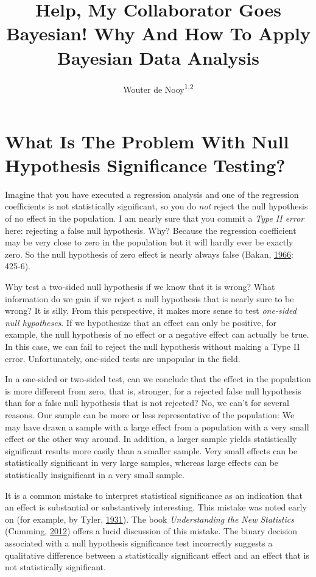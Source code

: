 \documentclass[doc]{apa6}
\title{Help, My Collaborator Goes Bayesian! Why And How To Apply Bayesian Data
Analysis}
\author{Wouter de Nooy\textsuperscript{1,2}}
\date{}
\affiliation{
\vspace{0.5cm}
\textsuperscript{1} Amsterdam School of Communication Research ASCor}
\begin{document}
\maketitle

\section{What Is The Problem With Null Hypothesis Significance
Testing?}\label{what-is-the-problem-with-null-hypothesis-significance-testing}

Imagine that you have executed a regression analysis and one of the
regression coefficients is not statistically significant, so you do
\emph{not} reject the null hypothesis of no effect in the population. I
am nearly sure that you commit a \emph{Type II error} here: rejecting a
false null hypothesis. Why? Because the regression coefficient may be
very close to zero in the population but it will hardly ever be exactly
zero. So the null hypothesis of zero effect is nearly always false
(Bakan,
\protect\hyperlink{ref-bakanTestSignificancePsychological1966}{1966}:
425-6).

Why test a two-sided null hypothesis if we know that it is wrong? What
information do we gain if we reject a null hypothesis that is nearly
sure to be wrong? It is silly. From this perspective, it makes more
sense to test \emph{one-sided null hypotheses}. If we hypothesize that
an effect can only be positive, for example, the null hypothesis of no
effect or a negative effect can actually be true. In this case, we can
fail to reject the null hypothesis without making a Type II error.
Unfortunately, one-sided tests are unpopular in the field.

In a one-sided or two-sided test, can we conclude that the effect in the
population is more different from zero, that is, stronger, for a
rejected false null hypothesis than for a false null hypothesis that is
not rejected? No, we can't for several reasons. Our sample can be more
or less representative of the population: We may have drawn a sample
with a large effect from a population with a very small effect or the
other way around. In addition, a larger sample yields statistically
significant results more easily than a smaller sample. Very small
effects can be statistically significant in very large samples, whereas
large effects can be statistically insignificant in a very small sample.

It is a common mistake to interpret statistical significance as an
indication that an effect is substantial or substantively interesting.
This mistake was noted early on (for example, by Tyler,
\protect\hyperlink{ref-tylerWhatStatisticalSignificance1931}{1931}). The
book \emph{Understanding the New Statistics} (Cumming,
\protect\hyperlink{ref-CummingUnderstandingnewstatistics2012}{2012})
offers a lucid discussion of this mistake. The binary decision
associated with a null hypothesis significance test incorrectly suggests
a qualitative difference between a statistically significant effect and
an effect that is not statistically significant.
\end{document}
